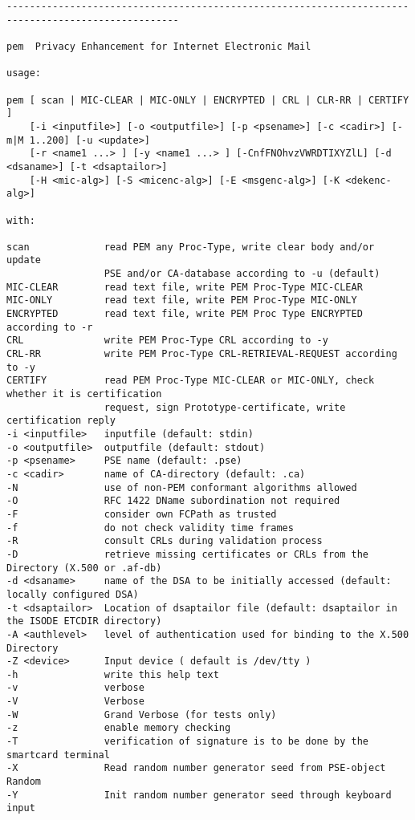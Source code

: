 {\begin{verbatim}
----------------------------------------------------------------------------------------------------

pem  Privacy Enhancement for Internet Electronic Mail

usage:

pem [ scan | MIC-CLEAR | MIC-ONLY | ENCRYPTED | CRL | CLR-RR | CERTIFY ]
    [-i <inputfile>] [-o <outputfile>] [-p <psename>] [-c <cadir>] [-m|M 1..200] [-u <update>] 
    [-r <name1 ...> ] [-y <name1 ...> ] [-CnfFNOhvzVWRDTIXYZlL] [-d <dsaname>] [-t <dsaptailor>]
    [-H <mic-alg>] [-S <micenc-alg>] [-E <msgenc-alg>] [-K <dekenc-alg>]

with:

scan             read PEM any Proc-Type, write clear body and/or update
                 PSE and/or CA-database according to -u (default)
MIC-CLEAR        read text file, write PEM Proc-Type MIC-CLEAR
MIC-ONLY         read text file, write PEM Proc-Type MIC-ONLY
ENCRYPTED        read text file, write PEM Proc Type ENCRYPTED according to -r
CRL              write PEM Proc-Type CRL according to -y
CRL-RR           write PEM Proc-Type CRL-RETRIEVAL-REQUEST according to -y
CERTIFY          read PEM Proc-Type MIC-CLEAR or MIC-ONLY, check whether it is certification
                 request, sign Prototype-certificate, write certification reply
-i <inputfile>   inputfile (default: stdin)
-o <outputfile>  outputfile (default: stdout)
-p <psename>     PSE name (default: .pse)
-c <cadir>       name of CA-directory (default: .ca)
-N               use of non-PEM conformant algorithms allowed
-O               RFC 1422 DName subordination not required
-F               consider own FCPath as trusted
-f               do not check validity time frames
-R               consult CRLs during validation process
-D               retrieve missing certificates or CRLs from the Directory (X.500 or .af-db)
-d <dsaname>     name of the DSA to be initially accessed (default: locally configured DSA)
-t <dsaptailor>  Location of dsaptailor file (default: dsaptailor in the ISODE ETCDIR directory)
-A <authlevel>   level of authentication used for binding to the X.500 Directory
-Z <device>      Input device ( default is /dev/tty )
-h               write this help text
-v               verbose
-V               Verbose
-W               Grand Verbose (for tests only)
-z               enable memory checking
-T               verification of signature is to be done by the smartcard terminal
-X               Read random number generator seed from PSE-object Random
-Y               Init random number generator seed through keyboard input


\end{verbatim}}

